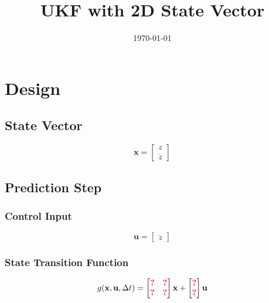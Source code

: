 \documentclass{article}
\title{UKF with 2D State Vector}
\author{\todo{Student name here}}
\date{\today}
\newcommand{\todo}[1]{\textcolor{red}{\textbf{#1}}}
\begin{document}
\maketitle

\section{Design}

\subsection{State Vector}

\begin{equation}
  \mathbf{x}=\begin{bmatrix}
  z \\
  \dot z
  \end{bmatrix}
\end{equation}

\subsection{Prediction Step}

\subsubsection{Control Input}

\begin{equation}
  \mathbf{u} = \begin{bmatrix}
  \ddot z
  \end{bmatrix}
\end{equation}

\subsubsection{State Transition Function}

\begin{equation}
  g(\mathbf{x}, \mathbf{u}, \Delta t) = \begin{bmatrix}
  \todo{?} & \todo{?} \\
  \todo{?} & \todo{?}
  \end{bmatrix}\mathbf{x} + \begin{bmatrix}
  \todo{?} \\
  \todo{?}
  \end{bmatrix}\mathbf{u}
\end{equation}
\end{document}
